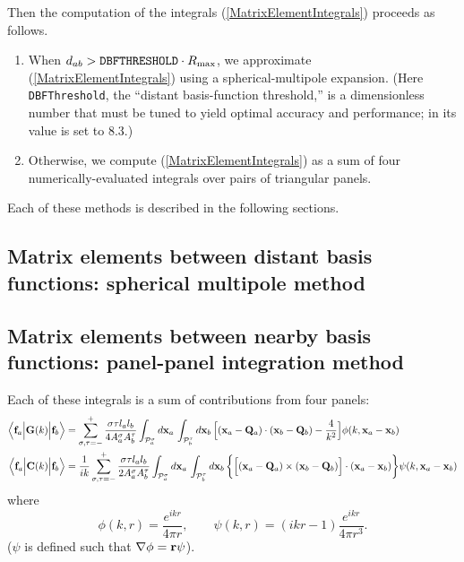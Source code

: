 \documentclass[dvips,letterpaper]{article}
\begin{document}
Then the computation of the integrals (\ref{MatrixElementIntegrals})
proceeds as follows. 

\begin{enumerate}
 \item
 When $d_{ab} > \texttt{DBFTHRESHOLD}\cdot R_{\hbox{\scriptsize{max}}}$,
 we approximate (\ref{MatrixElementIntegrals}) using a 
 spherical-multipole expansion. 
 (Here \texttt{DBFThreshold}, the ``distant basis-function threshold,''
 is a dimensionless number that must be tuned to yield 
 optimal accuracy and performance; in \lss its value is set to 8.3.)
 \item
 Otherwise, we compute (\ref{MatrixElementIntegrals}) as a sum
 of four numerically-evaluated integrals over pairs of triangular
 panels.
\end{enumerate}

Each of these methods is described in the following sections.

\subsection{Matrix elements between distant basis functions: 
            spherical multipole method}

\subsection{Matrix elements between nearby basis functions: 
            panel-panel integration method}

Each of these integrals is a sum of contributions from four panels:
\begin{align*}
 \Big\langle \mathbf{f}_a \Big| \mathbf{G}(k) \Big | \mathbf{f}_b \Big \rangle
&=
  \sum_{\sigma, \tau=-}^+ 
  \frac{\sigma\tau l_a l_b}{4A^\sigma_a A^\tau_b}
  \int_{\mathcal{P}_a^\sigma}  d\mathbf{x}_a \,
  \int_{\mathcal{P}_b^\tau}  d\mathbf{x}_b \,
   \Big[ (\mathbf{x}_a - \mathbf{Q}_a) \cdot (\mathbf{x}_b - \mathbf{Q}_b) 
        -\frac{4}{k^2}
   \Big]
   \phi(k,\mathbf{x}_a - \mathbf{x}_b)
\\
 \Big\langle \mathbf{f}_a \Big| \mathbf{C}(k) \Big | \mathbf{f}_b \Big \rangle
&=
  \frac{1}{ik}
  \sum_{\sigma, \tau=-}^+ 
  \frac{\sigma \tau l_a l_b}{2A^\sigma_a A^\tau_b}
  \int_{\mathcal{P}_a^\sigma}  d\mathbf{x}_a \,
  \int_{\mathcal{P}_b^\tau}  d\mathbf{x}_b \,
   \bigg\{ \Big[ (\mathbf{x}_a - \mathbf{Q}_a) \times (\mathbf{x}_b - \mathbf{Q}_b) \Big]
           \cdot (\mathbf{x}_a - \mathbf{x}_b)
   \bigg\}
   \psi(k,\mathbf{x}_a - \mathbf{x}_b)
\end{align*}
where  
$$ \phi(k, r)=\frac{e^{ikr}}{4\pi r}, \qquad 
   \psi(k, r)=(ikr-1)\frac{e^{ikr}}{4\pi r^3}.
$$
($\psi$ is defined such that $\nabla \phi = \mathbf{r} \psi$).
\end{document}
